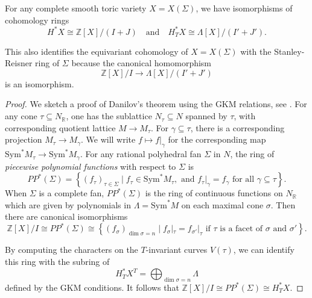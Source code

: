 \begin{theorem}[Danilov]
	For any complete smooth toric variety \( X = X(\Sigma) \), we have isomorphisms of cohomology rings
	\[
		H^*X \cong \mathbb{Z}[X] / (I + J) \quad \text{and} \quad H_T^*X \cong \Lambda[X] / (I' + J').
	\]
\end{theorem}
This also identifies the equivariant cohomology of \( X = X(\Sigma) \) with the Stanley-Reisner ring of \( \Sigma \) because the canonical homomorphism
\[
	\mathbb{Z}[X] / I \to \Lambda[X] / (I' + J')
\]
is an isomorphism.
\begin{proof}
	We sketch a proof of Danilov's theorem using the GKM relations, see \cite{fulton-anderson}. For any cone \( \tau \subseteq N_\mathbb{R} \), one has the sublattice \( N_\tau \subseteq N \) spanned by \( \tau \), with corresponding quotient lattice \( M \to M_\tau \). For \( \gamma \subseteq \tau \), there is a corresponding projection \( M_\tau \to M_\gamma \). We will write \( f \mapsto f|_\gamma \) for the corresponding map \( \mathrm{Sym}^* M_\tau \to \mathrm{Sym}^* M_\gamma \). For any rational polyhedral fan \( \Sigma \) in \( N \), the ring of \emph{piecewise polynomial functions} with respect to \( \Sigma \) is
	\[
		PP^*(\Sigma) = \left\{ (f_\tau)_{\tau \in \Sigma} \mid f_\tau \in \mathrm{Sym}^* M_\tau, \text{ and } f_\tau|_\gamma = f_\gamma \text{ for all } \gamma \subseteq \tau \right\}.
	\]
	When \( \Sigma \) is a complete fan, \( PP^*(\Sigma) \) is the ring of continuous functions on \( N_\mathbb{R} \) which are given by polynomials in \( \Lambda = \mathrm{Sym}^* M \) on each maximal cone \( \sigma \). Then there are canonical isomorphisms
	\[
		\mathbb{Z}[X]/I \cong PP^*(\Sigma)
		\cong \left\{ (f_\sigma)_{\dim \sigma = n} \mid f_\sigma|_\tau = f_{\sigma'}|_\tau \text{ if } \tau \text{ is a facet of } \sigma \text{ and } \sigma' \right\}.
	\]


	By computing the characters on the \( T \)-invariant curves \( V(\tau) \), we can identify this ring with the subring of
	\[
		H_T^*X^T = \bigoplus_{\dim \sigma = n} \Lambda
	\]
	defined by the GKM conditions. It follows that \( \mathbb{Z}[X]/I \cong PP^*(\Sigma) \cong H_T^*X \).
\end{proof}
